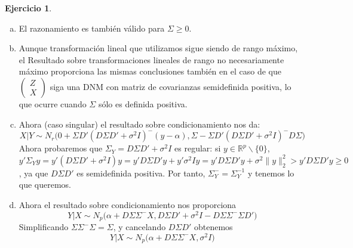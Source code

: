 \documentclass[12pt,spanish]{article}
\theoremstyle{definition}
\newtheorem{exercise}{Ejercicio}
\begin{document}
\begin{exercise} %
  \begin{enumerate}[a)] Especificaremos los matices que cambian en los
    argumentos anteriores.
  \item El razonamiento es también válido para $\Sigma\geq 0$.
  \item Aunque transformación lineal que utilizamos sigue siendo de
    rango máximo, el Resultado sobre transformaciones lineales de
    rango no necesariamente máximo proporciona las mismas conclusiones
    también en el caso de que $
    \begin{pmatrix}
      Z \\ X
    \end{pmatrix}$ siga una DNM con matriz de covarianzas semidefinida
    positiva, lo que ocurre cuando $\Sigma$ sólo es definida positiva.
  \item Ahora (caso singular) el resultado sobre condicionamiento nos
    da:
    \[X|Y\sim N_r\Big(0+\Sigma D'(D\Sigma
      D'+\sigma^2I)^-(y-\alpha),\Sigma-\Sigma D'(D\Sigma
      D'+\sigma^2I)^-D\Sigma\Big)\] Ahora probaremos que
    $\Sigma_Y=D\Sigma D'+\sigma^2I$ es regular: si
    $y\in \mathbb{R}^p\backslash\{0\}$,
    $y'\Sigma_Y y=y'(D\Sigma D'+\sigma^2I)y=y'D\Sigma
    D'y+y'\sigma^2Iy=y'D\Sigma D'y+\sigma^2\|y\|_2^2>y'D\Sigma D'y\geq
    0$, ya que $D\Sigma D'$ es semidefinida positiva. Por tanto,
    $\Sigma_Y^-=\Sigma_Y^{-1}$ y tenemos lo que queremos.
  \item Ahora el resultado sobre condicionamiento nos proporciona
    \[Y|X\sim N_p\Big(\alpha+D\Sigma\Sigma^-X,D\Sigma
      D'+\sigma^2I-D\Sigma\Sigma^-\Sigma D'\Big)\] Simplificando
    $\Sigma\Sigma^-\Sigma=\Sigma$, y cancelando $D\Sigma D'$ obtenemos
    \[Y|X\sim N_p\Big(\alpha+D\Sigma\Sigma^-X,\sigma^2I\Big)\]
  \end{enumerate}
\end{exercise}
\end{document}
